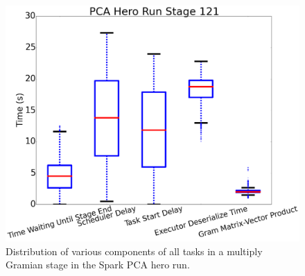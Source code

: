 


\begin{figure}[t]
\includegraphics[width=.5\textwidth]{fig/pca_box_and_whiskers.png}
\caption{Distribution of various components of all tasks in a multiply Gramian stage in the Spark PCA hero run. }
\label{fig:whisker}
\end{figure}


